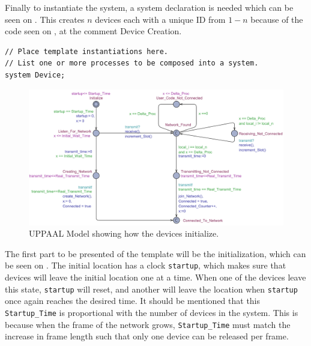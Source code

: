 Finally to instantiate the system, a system declaration is needed which can be seen on .
This creates $n$ devices each with a unique ID from $1-n$ because of the code seen on , at the comment Device Creation.

\begin{lstlisting}[language={[GUI]Uppaal}, % use GUI flavor
columns={[l]flexible},
frameround=fftt, frame=shadowbox, rulesepcolor=\color{gray},
caption={Code for system declarations.}, label={UPPAAL_System_Dcl}]
// Place template instantiations here.
// List one or more processes to be composed into a system.
system Device;
\end{lstlisting}

\begin{figure}
  \includegraphics[width=1\textwidth]{Figures/Model/Device_Connecting.pdf} 
\caption{UPPAAL Model showing how the devices initialize.}
\label{fig:UPPAAL_Intitialization}
\end{figure}

\bigskip \noindent
The first part to be presented of the template will be the initialization, which can be seen on .
The initial location has a clock \texttt{startup}, which makes sure that devices will leave the initial location one at a time.
When one of the devices leave this state, \texttt{startup} will reset, and another will leave the location when \texttt{startup} once again reaches the desired time.
It should be mentioned that this \texttt{Startup\_Time} is proportional with the number of devices in the system.
This is because when the frame of the network grows, \texttt{Startup\_Time} must match the increase in frame length such that only one device can be released per frame.

